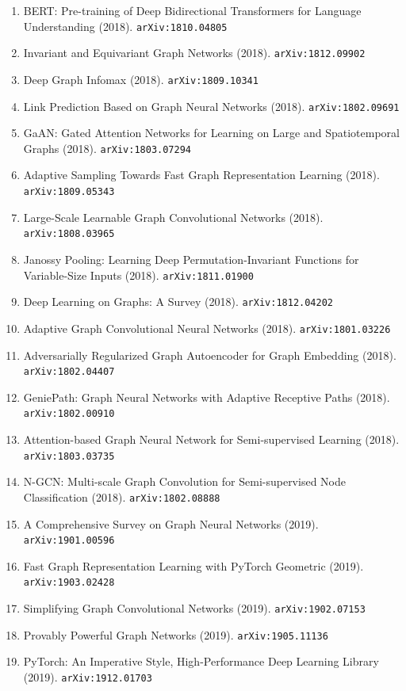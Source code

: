 \documentclass[11pt]{article}
\begin{document}
\begin{enumerate}
  \item BERT: Pre-training of Deep Bidirectional Transformers for Language
  Understanding (2018). \texttt{arXiv:1810.04805}
  \item Invariant and Equivariant Graph Networks (2018). \texttt{arXiv:1812.09902}
  \item Deep Graph Infomax (2018). \texttt{arXiv:1809.10341}
  \item Link Prediction Based on Graph Neural Networks (2018). \texttt{arXiv:1802.09691}
  \item GaAN: Gated Attention Networks for Learning on Large and Spatiotemporal
  Graphs (2018). \texttt{arXiv:1803.07294}
  \item Adaptive Sampling Towards Fast Graph Representation Learning (2018). \texttt{arXiv:1809.05343}
  \item Large-Scale Learnable Graph Convolutional Networks (2018). \texttt{arXiv:1808.03965}
  \item Janossy Pooling: Learning Deep Permutation-Invariant Functions for
  Variable-Size Inputs (2018). \texttt{arXiv:1811.01900}
  \item Deep Learning on Graphs: A Survey (2018). \texttt{arXiv:1812.04202}
  \item Adaptive Graph Convolutional Neural Networks (2018). \texttt{arXiv:1801.03226}
  \item Adversarially Regularized Graph Autoencoder for Graph Embedding (2018). \texttt{arXiv:1802.04407}
  \item GeniePath: Graph Neural Networks with Adaptive Receptive Paths (2018). \texttt{arXiv:1802.00910}
  \item Attention-based Graph Neural Network for Semi-supervised Learning (2018). \texttt{arXiv:1803.03735}
  \item N-GCN: Multi-scale Graph Convolution for Semi-supervised Node
  Classification (2018). \texttt{arXiv:1802.08888}
  \item A Comprehensive Survey on Graph Neural Networks (2019). \texttt{arXiv:1901.00596}
  \item Fast Graph Representation Learning with PyTorch Geometric (2019). \texttt{arXiv:1903.02428}
  \item Simplifying Graph Convolutional Networks (2019). \texttt{arXiv:1902.07153}
  \item Provably Powerful Graph Networks (2019). \texttt{arXiv:1905.11136}
  \item PyTorch: An Imperative Style, High-Performance Deep Learning Library (2019). \texttt{arXiv:1912.01703}

\end{enumerate}
\end{document}
